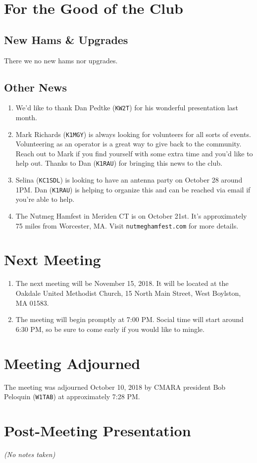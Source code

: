 \documentclass[10pt,letterpaper]{article}
\begin{document}
\section{For the Good of the Club}

\subsection{New Hams \& Upgrades}
There we no new hams nor upgrades.

\subsection{Other News}
\begin{enumerate}
  \item We'd like to thank Dan Pedtke (\texttt{KW2T}) for his wonderful presentation last month.
  \item Mark Richards (\texttt{K1MGY}) is always looking for volunteers for all sorts of events. Volunteering as an operator is a great way to give back to the community. Reach out to Mark if you find yourself with some extra time and you'd like to help out. Thanks to Dan (\texttt{K1RAU}) for bringing this news to the club.
  \item Selina (\texttt{KC1SDL}) is looking to have an antenna party on October 28 around 1PM. Dan (\texttt{K1RAU}) is helping to organize this and can be reached via email if you're able to help.
  \item The Nutmeg Hamfest in Meriden CT is on October 21st. It's approximately 75 miles from Worcester, MA. Visit \texttt{nutmeghamfest.com} for more details.
\end{enumerate}

\section{Next Meeting}
\begin{enumerate}
  \item The next meeting will be November 15, 2018. It will be located at the Oakdale United Methodist Church, 15 North Main Street, West Boylston, MA 01583.
  \item The meeting will begin promptly at 7:00 PM. Social time will start around 6:30 PM, so be sure to come early if you would like to mingle.
\end{enumerate}

\section{Meeting Adjourned}
The meeting was adjourned October 10, 2018 by CMARA president Bob Peloquin (\texttt{W1TAB}) at approximately 7:28 PM.

\section{Post-Meeting Presentation}
\emph{(No notes taken)}
\end{document}
